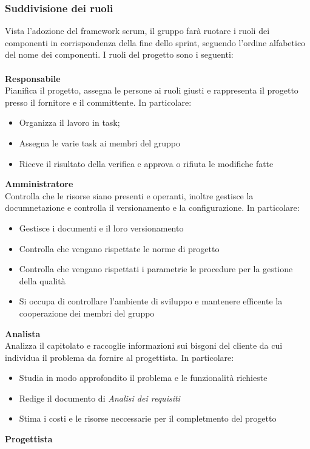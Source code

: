\documentclass[12pt]{article}
\begin{document}
\subsubsection{Suddivisione dei ruoli}
Vista l'adozione del framework scrum, il gruppo farà ruotare i ruoli dei componenti in corrispondenza della fine dello sprint, seguendo l'ordine alfabetico del nome dei componenti.
I ruoli del progetto sono i seguenti:\\\\
\textbf{Responsabile}\\
Pianifica il progetto, assegna le persone ai ruoli giusti e rappresenta il progetto presso il fornitore e il committente. In particolare:
\begin{itemize}
    \item Organizza il lavoro in task;
    \item Assegna le varie task ai membri del gruppo 
    \item Riceve il risultato della verifica e approva o rifiuta le modifiche fatte
\end{itemize}
\textbf{Amministratore}\\
Controlla che le risorse siano presenti e operanti, inoltre gestisce la documnetazione e controlla il versionamento e la configurazione. In particolare:
\begin{itemize}
    \item Gestisce i documenti e il loro versionamento
    \item Controlla che vengano rispettate le norme di progetto
    \item Controlla che vengano rispettati i parametrie le procedure per la gestione della qualità
    \item Si occupa di controllare l'ambiente di sviluppo e mantenere efficente la cooperazione dei membri del gruppo 
\end{itemize}
\textbf{Analista}\\
Analizza il capitolato e raccoglie informazioni sui bisgoni del cliente da cui individua il problema da fornire al progettista. In particolare:
\begin{itemize}
    \item Studia in modo approfondito il problema e le funzionalità richieste
    \item Redige il documento di \textit{Analisi dei requisiti}
    \item Stima i costi e le risorse neccessarie per il completmento del progetto
\end{itemize}
\textbf{Progettista}\\
\end{document}
